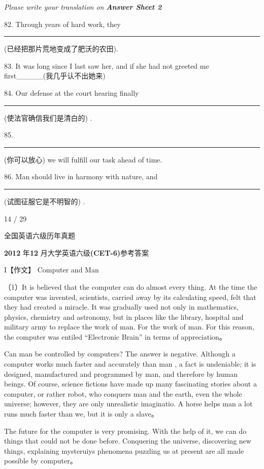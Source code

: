 \documentclass[UTF8,11pt]{ctexart}
\begin{document}
\textit{Please write your translation on}\textbf{\textit{ Answer Sheet 2}}


82. Through years of hard work, they\par\noindent\rule{.95\linewidth}{.4pt}\par (已经把那片荒地变成了肥沃的农田).


83. It was long since I last saw her, and if she had not greeted me first\_\_\_\_\_(我几乎认不出她来)


84. Our defense at the court hearing finally \par\noindent\rule{.95\linewidth}{.4pt}\par  (使法官确信我们是清白的) .


85. \par\noindent\rule{.95\linewidth}{.4pt}\par  (你可以放心) we will fulfill our task ahead of time.


86. Man should live in harmony with nature, and \par\noindent\rule{.95\linewidth}{.4pt}\par  (试图征服它是不明智的) .


14 / 29


全国英语六级历年真题


\textbf{2012} 年\textbf{12} 月大学英语六级\textbf{(CET-6)}参考答案


I【作文】 Computer and Man


（1）It is believed that the computer can do almost every thing. At the time the computer was invented, scientists, carried away by its calculating speed, felt that they had created a miracle. It was gradually used not only in mathematics, physics, chemistry and astronomy, but in places like the library, hospital and military army to replace the work of man. For the work of man. For this reason, the computer was entiled “Electronic Brain” in terms of appreciation。


Can man be controlled by computers? The answer is negative. Although a computer works much faster and accurately than man , a fact is undeniable; it is designed, manufactured and programmed by man, and therefore by human beings. Of course, science fictions have made up many fascinating stories about a computer, or rather robot, who conquers man and the earth, even the whole universe; however, they are only unrealistic imaginatio. A horse helps man a lot runs much faster than we, but it is only a slave。


The future for the computer is very promising. With the help of it, we can do things that could not be done before. Conquering the universe, discovering new things, explaining mysteruiys phenomena puzzling us at present are all made possible by computer。
\end{document}
